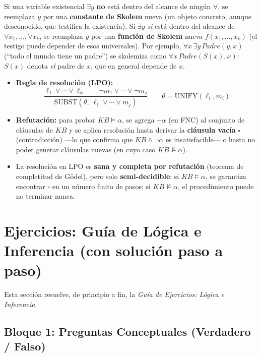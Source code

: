 \begin{definition}[Skolemización]
Si una variable existencial $\exists y$ \textbf{no} está dentro del alcance de ningún $\forall$, se
reemplaza $y$ por una \textbf{constante de Skolem} nueva (un objeto concreto, aunque desconocido, que
testifica la existencia). Si $\exists y$ \emph{sí} está dentro del alcance de $\forall x_1,\ldots,
\forall x_k$, se reemplaza $y$ por una \textbf{función de Skolem} nueva $f(x_1,\ldots,x_k)$ (el
testigo puede depender de esos universales). Por ejemplo, $\forall x\,\exists y\,Padre(y,x)$
(``todo el mundo tiene un padre'') se skolemiza como $\forall x\,Padre(S(x),x)$: $S(x)$ denota
\emph{el} padre de $x$, que en general depende de $x$.
\end{definition}

\begin{itemize}
    \item \textbf{Regla de resolución (LPO):}
    $$\dfrac{\ell_1 \lor \cdots \lor \ell_k \qquad \neg m_1 \lor \cdots \lor \neg m_j}
    {\text{SUBST}(\theta,\ \ell_1 \lor \cdots \lor m_j)} \qquad \theta = \text{UNIFY}(\ell_i, m_i)$$
    \item \textbf{Refutación:} para probar $KB \models \alpha$, se agrega $\neg\alpha$ (en FNC) al
    conjunto de cláusulas de $KB$ y se aplica resolución hasta derivar la \textbf{cláusula vacía}
    $\square$ (contradicción) —lo que confirma que $KB \land \neg\alpha$ es insatisfacible— o hasta
    no poder generar cláusulas nuevas (en cuyo caso $KB \not\models \alpha$).
    \item La resolución en LPO es \textbf{sana y completa por refutación} (teorema de completitud de
    Gödel), pero solo \textbf{semi-decidible}: si $KB \models \alpha$, se garantiza encontrar
    $\square$ en un número finito de pasos; si $KB \not\models \alpha$, el procedimiento puede no
    terminar nunca.
\end{itemize}

\newpage
\section{Ejercicios: Guía de Lógica e Inferencia (con solución paso a paso)}

Esta sección resuelve, de principio a fin, la \textit{Guía de Ejercicios: Lógica e Inferencia}.

\subsection{Bloque 1: Preguntas Conceptuales (Verdadero / Falso)}

